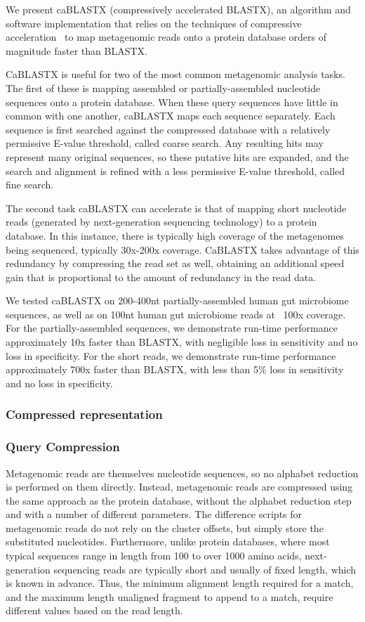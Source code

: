 \documentclass[review,preprint,12pt]{elsarticle}
\theoremstyle{definition}
\theoremstyle{remark}
\numberwithin{equation}{section}
\begin{document}
We present caBLASTX (compressively accelerated BLASTX), an algorithm and 
software implementation that relies on the techniques of compressive 
acceleration~\cite{Loh, Daniels} to map metagenomic reads onto a protein 
database orders of magnitude faster than BLASTX.

CaBLASTX is useful for two of the most common metagenomic analysis tasks. 
The first of these is mapping assembled or partially-assembled
nucleotide sequences onto a protein database. 
When these query sequences have
little in common with one another, caBLASTX maps each sequence separately. 
Each sequence is first searched against the compressed database with a 
relatively permissive E-value threshold, called coarse search. 
Any resulting hits may represent many original sequences, so these putative 
hits are expanded, and the search and alignment is refined with a less 
permissive E-value threshold, called fine search.

The second task caBLASTX can accelerate is that of mapping short nucleotide
reads (generated by next-generation sequencing technology) to a protein
database. In this instance, there is typically high coverage of the metagenomes
being sequenced, typically 30x-200x coverage. CaBLASTX takes advantage of this
redundancy
by compressing the read set as well, obtaining an additional speed gain that is
proportional to the amount of redundancy in the read data.


We tested caBLASTX on 200-400nt partially-assembled human gut microbiome
sequences, as well as on 100nt human gut microbiome reads at ~100x coverage.
For the partially-assembled sequences, we demonstrate run-time performance
approximately 10x faster than BLASTX, with negligible loss in sensitivity and
no loss in specificity. For the short reads, we demonstrate run-time
performance approximately 700x faster than BLASTX, with less than 5\% loss in
sensitivity and no loss in specificity.

\subsubsection*{Compressed representation}



\subsubsection*{Query Compression}

Metagenomic reads are themselves nucleotide sequences, so no alphabet reduction
is performed on them directly.
Instead, metagenomic reads are compressed using the same approach as the
protein database, without the alphabet reduction step and with a number of
different parameters.
The difference scripts for metagenomic reads do not rely on the cluster offsets,
but simply store the substituted nucleotides.
Furthermore, unlike protein databases, where most typical sequences range in 
length from 100 to over 1000 amino acids, next-generation sequencing reads are 
typically short and usually of fixed length, which is known in advance.
Thus, the minimum alignment length required for a match, and the maximum
length unaligned fragment to append to a match, require different values based
on the read length.
\end{document}
